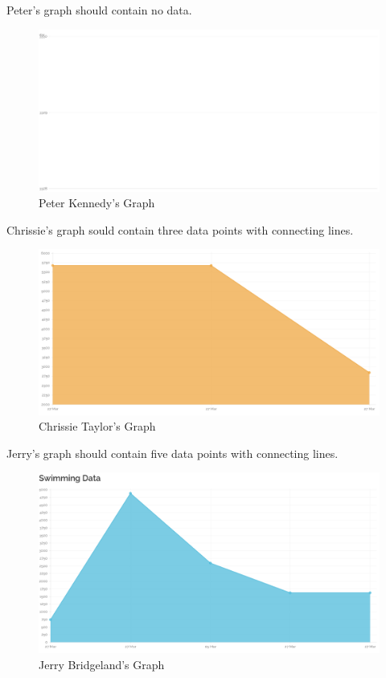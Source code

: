 \documentclass{article}[12pt,a4paper]
\begin{document}
{Peter's graph should contain no data.

\begin{figure}[h!]
    \includegraphics[scale=0.33]{images/testing/graphs/peter}
    \caption{Peter Kennedy's Graph}
\end{figure}

\clearpage

Chrissie's graph sould contain three data points with connecting lines.

\begin{figure}[h!]
    \includegraphics[scale=0.33]{images/testing/graphs/chrissie}
    \caption{Chrissie Taylor's Graph}
\end{figure}

\clearpage

Jerry's graph should contain five data points with connecting lines.

\begin{figure}[h!]
    \includegraphics[scale=0.33]{images/testing/graphs/jerry}
    \caption{Jerry Bridgeland's Graph}
\end{figure}

}
\end{document}
